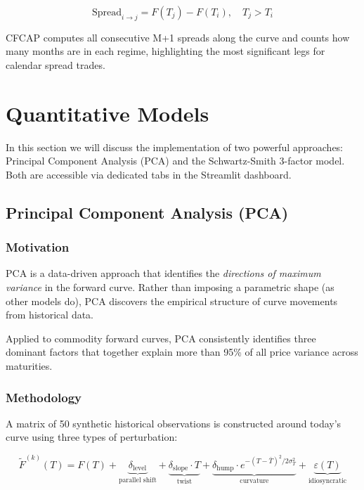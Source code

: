 \documentclass[11pt,a4paper]{article}
\begin{document}
\[
\text{Spread}_{i \to j} = F(T_j) - F(T_i), \quad T_j > T_i
\]

CFCAP computes all consecutive M+1 spreads along the curve and counts how many months are in each regime, highlighting the most significant legs for calendar spread trades.

\section{Quantitative Models}

In this section we will discuss the implementation of two powerful approaches: Principal Component Analysis (PCA) and the Schwartz-Smith 3-factor model. Both are accessible via dedicated tabs in the Streamlit dashboard.

\subsection{Principal Component Analysis (PCA)}

\subsubsection{Motivation}

PCA is a data-driven approach that identifies the \textit{directions of maximum variance} in the forward curve. Rather than imposing a parametric shape (as other models do), PCA discovers the empirical structure of curve movements from historical data.

Applied to commodity forward curves, PCA consistently identifies three dominant factors that together explain more than 95\% of all price variance across maturities.

\subsubsection{Methodology}

A matrix of 50 synthetic historical observations is constructed around today's curve using three types of perturbation:

\begin{equation}
\tilde{F}^{(k)}(T) = F(T) + \underbrace{\delta_{\text{level}}}_{\text{parallel shift}}
                             + \underbrace{\delta_{\text{slope}} \cdot T}_{\text{twist}}
                             + \underbrace{\delta_{\text{hump}} \cdot e^{-(T-\bar{T})^2/2\sigma_T^2}}_{\text{curvature}}
                             + \underbrace{\varepsilon(T)}_{\text{idiosyncratic}}
\end{equation}
\end{document}
